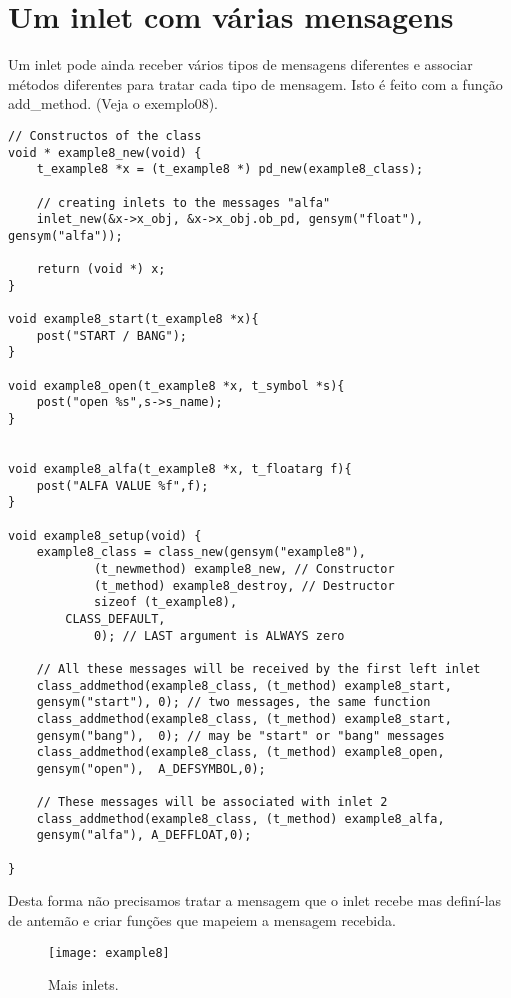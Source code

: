\section{Um inlet com várias mensagens}

Um inlet pode ainda receber vários tipos de mensagens diferentes e associar
métodos diferentes para tratar cada tipo de mensagem. Isto é feito com a função
add\_method.  (Veja o exemplo08).

\begin{lstlisting}
// Constructos of the class
void * example8_new(void) {
    t_example8 *x = (t_example8 *) pd_new(example8_class);

    // creating inlets to the messages "alfa"
    inlet_new(&x->x_obj, &x->x_obj.ob_pd, gensym("float"), gensym("alfa"));

    return (void *) x;
}

void example8_start(t_example8 *x){
    post("START / BANG");
}

void example8_open(t_example8 *x, t_symbol *s){
    post("open %s",s->s_name);
}


void example8_alfa(t_example8 *x, t_floatarg f){
	post("ALFA VALUE %f",f);
}

void example8_setup(void) {
    example8_class = class_new(gensym("example8"),
            (t_newmethod) example8_new, // Constructor
            (t_method) example8_destroy, // Destructor
            sizeof (t_example8),
	    CLASS_DEFAULT,
            0); // LAST argument is ALWAYS zero

    // All these messages will be received by the first left inlet
    class_addmethod(example8_class, (t_method) example8_start, 
	gensym("start"), 0); // two messages, the same function
    class_addmethod(example8_class, (t_method) example8_start, 
	gensym("bang"),  0); // may be "start" or "bang" messages
    class_addmethod(example8_class, (t_method) example8_open,  
	gensym("open"),  A_DEFSYMBOL,0);

    // These messages will be associated with inlet 2
    class_addmethod(example8_class, (t_method) example8_alfa,  
	gensym("alfa"), A_DEFFLOAT,0); 

}
\end{lstlisting}

Desta forma não precisamos tratar a mensagem que o inlet recebe mas definí-las
de antemão e criar funções que mapeiem a mensagem recebida.

\begin{figure}[h!]
	\centering
	\texttt{[image: example8]}
	\caption{Mais inlets.}
\end{figure}


